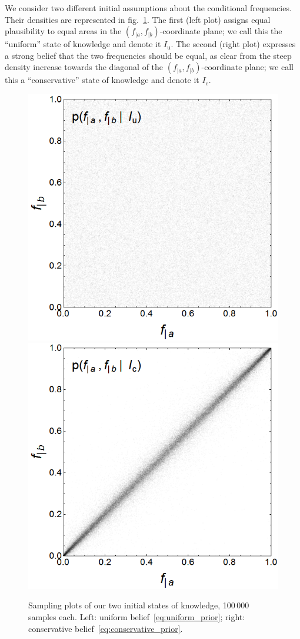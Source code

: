 \documentclass[\ifafour a4paper,12pt,\else a5paper,10pt,\fi%
onecolumn,oneside,article,%
british%
]{memoir}
\theoremstyle{remark}
\theoremstyle{innote}
\renewcommand*{\|}[1][]{\nonscript\,#1\vert\nonscript\;\mathopen{}}
\newcommand*{\fig}{fig.}%
\newcommand*{\yI}{I}
\newcommand*{\yIu}{\yI_\text{u}}
\newcommand*{\yIc}{\yI_\text{c}}
\newcommand*{\ya}{a}
\newcommand*{\yb}{b}
\begin{document}
We consider two different initial assumptions about the conditional
frequencies. Their densities are represented in
\fig~\ref{fig:initial_beliefs}. The first (left plot) assigns equal
plausibility to equal areas in the $(f_{|\ya},f_{|\yb})$-coordinate plane;
we call this the \enquote{uniform} state of knowledge and denote it $\yIu$.
The second (right plot) expresses a strong belief that the two frequencies
should be equal, as clear from the steep density increase towards the diagonal of
the $(f_{|\ya},f_{|\yb})$-coordinate plane; we call this a
\enquote{conservative} state of knowledge and denote it $\yIc$.
\begin{figure}[b!]%
 \centering\includegraphics[width=0.49\linewidth]{unif_prior_list.png}%
\includegraphics[width=0.49\linewidth]{conserv_prior_list.png}
\caption{Sampling plots of our two initial states of knowledge, 100\,000
  samples each. Left: uniform belief~\eqref{eq:uniform_prior}; right:
  conservative belief~\eqref{eq:conservative_prior}.}\label{fig:initial_beliefs}
\end{figure}%
\end{document}
